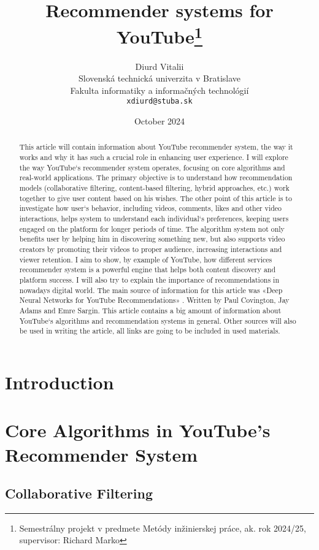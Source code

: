 \documentclass[12pt,english,a4paper]{article}
\title{Recommender systems for YouTube\thanks{Semestrálny projekt v predmete Metódy inžinierskej práce, ak. rok 2024/25, supervisor: Richard Marko}}
\author{Diurd Vitalii\\[2pt]
	{\small Slovenská technická univerzita v Bratislave}\\
	{\small Fakulta informatiky a informačných technológií}\\
	{\small \texttt{xdiurd@stuba.sk}}
	}
\date{\small October 2024} %
\begin{document}
\maketitle

\begin{abstract}
This article will contain information about YouTube recommender system, the way it works and why it has such a crucial role in enhancing user experience. I will explore the way YouTube`s recommender system operates, focusing on core algorithms and real-world applications. The primary objective is to understand how recommendation models (collaborative filtering, content-based filtering, hybrid approaches, etc.) work together to give user content based on his wishes. The other point of this article is to investigate how user`s behavior, including videos, comments, likes and other video interactions, helps system to understand each individual`s preferences, keeping users engaged on the platform for longer periods of time. The algorithm system not only benefits user by helping him in discovering something new, but also supports video creators by promoting their videos to proper audience, increasing interactions and viewer retention. I aim to show, by example of YouTube,   how different services recommender system is a powerful engine that helps both content discovery and platform success. I will also try to explain the importance of recommendations in nowadays digital world. The main source of information for this article was «Deep Neural Networks for YouTube Recommendations» \cite{DeepYouTube}.  Written by Paul Covington, Jay Adams and Emre Sargin. This article contains a big amount of information about YouTube`s algorithms and recommendation systems in general. Other sources will also be used in writing the article, all links are going to be included in used materials.
\end{abstract}

\section{Introduction} \label{intro}
\section{Core Algorithms in YouTube’s Recommender System} \label{core}
\subsection{Collaborative Filtering} \label{core:collaborative}
\end{document}
